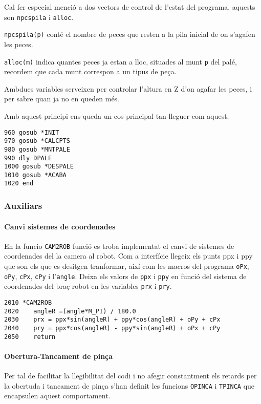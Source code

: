 Cal fer especial menció a dos vectors de control de l'estat del programa,
aquests son \texttt{npcspila} i \texttt{alloc}.

\texttt{npcspila(p)} conté el nombre de peces que resten a la pila inicial de on s'agafen
les peces.

\texttt{alloc(m)} indica quantes peces ja estan a lloc, situades al munt \texttt{p} del palé, recordem 
que cada munt correspon a un tipus de peça.

Ambdues variables serveixen per controlar l'altura en Z d'on agafar les peces, i per sabre quan
ja no en queden més.

Amb aquest principi ens queda un cos principal tan lleguer com aquest.
\begin{verbatim}
960 gosub *INIT
970 gosub *CALCPTS
980 gosub *MNTPALE
990 dly DPALE
1000 gosub *DESPALE
1010 gosub *ACABA
1020 end
\end{verbatim}

\subsubsection{Auxiliars}
\paragraph{Canvi sistemes de coordenades}
En la funcio \texttt{CAM2ROB} funció es troba implementat el canvi de sistemes
de coordenades del la camera al robot.
Com a interfície llegeix els punts ppx i ppy que son els que es desitgen
tranformar, així com les macros del programa \texttt{oPx}, \texttt{oPy},
\texttt{cPx}, \texttt{cPy} i l'\texttt{angle}. Deixa els valors de
\texttt{ppx} i \texttt{ppy} en funció del sistema de coordenades del braç
robot en les variables \texttt{prx} i \texttt{pry}.

\begin{verbatim}
2010 *CAM2ROB
2020 	angleR =(angle*M_PI) / 180.0
2030    prx = ppx*sin(angleR) + ppy*cos(angleR) + oPy + cPx
2040    pry = ppx*cos(angleR) - ppy*sin(angleR) + oPx + cPy
2050    return
\end{verbatim}

\paragraph{Obertura-Tancament de pinça}
Per tal de facilitar la llegibilitat del codi i no afegir constantment
els retards per la obertuda i tancament de pinça s'han definit les funcions
\texttt{OPINCA} i \texttt{TPINCA} que encapsulen aquest comportament.

